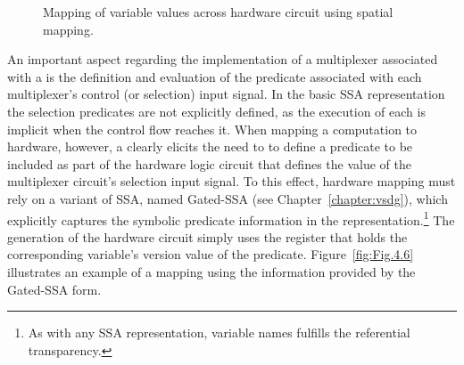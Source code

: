 \begin{figure}[htbp]
\centering
  
\caption{Mapping of variable values across hardware circuit using spatial mapping.}
\label{fig:Fig.4.5}
\end{figure}

An important aspect regarding the implementation of a multiplexer associated with a \phifun is the definition and evaluation of the predicate associated with each multiplexer's control (or selection) input signal. 
In the basic SSA representation the selection predicates are not explicitly defined, as the execution of each \phifun is implicit when the control flow reaches it. 
When mapping a computation to hardware, however, a \phifun clearly elicits the need to  to define a predicate to be included as part of the hardware logic circuit that defines the value of the multiplexer circuit's selection input signal.  
To this effect, hardware mapping must rely on a variant of SSA, named Gated-SSA  (see Chapter~\ref{chapter:vsdg}), which explicitly captures the symbolic predicate information in the representation.\footnote{As with any SSA representation,   variable names  fulfills the referential transparency. }
The generation of the hardware circuit simply uses the register that holds the corresponding variable's version value of the predicate.
Figure~\ref{fig:Fig.4.6} illustrates an example of a mapping using the information provided by the Gated-SSA form.

